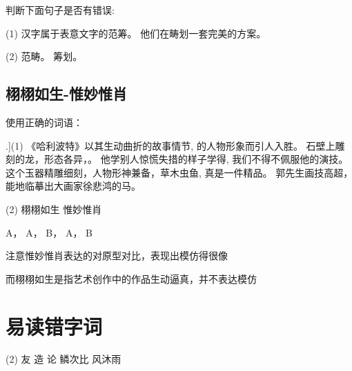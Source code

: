 \begin{question}
判断下面句子是否有错误:

\begin{tasks}(1)
  \task 汉字属于表意文字的范筹。
  \task 他们在畴划一套完美的方案。
 \end{tasks}
\end{question}
\begin{solution}
  \begin{tasks}(2)
    \task 范畴。
    \task 筹划。
   \end{tasks}
\end{solution}

  \subsection{栩栩如生-惟妙惟肖}

\begin{question}
使用正确的词语：

  \begin{tasks}[counter-format=tsk[1].](1)
    \task 《哈利波特》以其生动曲折的故事情节, \blank[width=1cm]{}的人物形象而引人入胜。
    \task 石壁上雕刻的龙，形态各异，\blank[width=1cm]{}。
    \task 他学别人惊慌失措的样子学得\blank[width=1cm]{}, 我们不得不佩服他的演技。
    \task 这个玉器精雕细刻，人物形神兼备，草木虫鱼\blank[width=1cm]{}, 真是一件精品。
    \task 郭先生画技高超，能\blank[width=1cm]{}地临摹出大画家徐悲鸿的马。
  \end{tasks}

  \begin{tasks}(2)
    \task 栩栩如生  \task 惟妙惟肖
  \end{tasks}
\end{question}
\begin{solution}
A， A， B， A， B

  注意惟妙惟肖表达的对原型对比，表现出模仿得很像

  而栩栩如生是指艺术创作中的作品生动逼真，并不表达模仿
\end{solution}

\section{易读错字词}
\begin{tasks}[style=enumerate](2)
    \task 友
    \task 造
    \task {}论
    \task 鳞次比
    \task {}风沐雨
\end{tasks}



